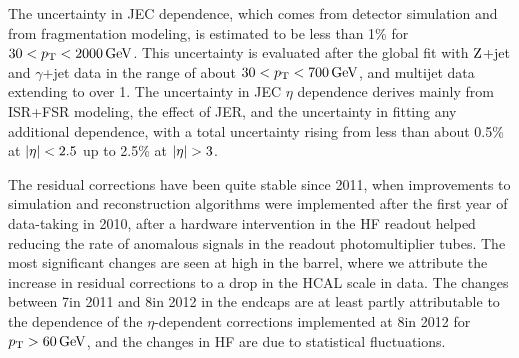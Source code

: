 \documentclass[11pt,twoside,a4paper,cmspaper,final,collab]{cms-tdr}
\begin{document}
The uncertainty in JEC \pt dependence, which comes from detector simulation and from fragmentation modeling, is estimated to be less than 1\% for $30<p_{\mathrm{T}}<2000\,\text{Ge\hspace{-.08em}V}$. This uncertainty is evaluated after the global fit with $\mathrm{Z}$+jet and $\gamma$+jet data in the range of about $30<p_{\mathrm{T}}<700\,\text{Ge\hspace{-.08em}V}$, and multijet data extending to over 1\TeV.
The uncertainty in JEC $\eta$ dependence derives mainly from ISR+FSR modeling, the effect of JER, and the uncertainty in fitting any additional \pt dependence, with a total uncertainty rising from less than about 0.5\% at $\lvert \eta \rvert<2.5$ up to 2.5\% at $\lvert \eta \rvert>3$.

The residual corrections have been quite stable since 2011, when improvements to simulation and reconstruction algorithms were implemented after the first year of data-taking in 2010, after a hardware intervention in the HF readout helped reducing the rate of anomalous signals in the readout photomultiplier tubes. The most significant changes are seen at high \pt in the barrel, where we attribute the increase in residual corrections to a drop in the HCAL scale in data.
The changes between 7\TeV in 2011 and 8\TeV in 2012 in the endcaps are at least partly attributable to the \pt dependence of the $\eta$-dependent corrections implemented at 8\TeV in 2012 for $p_{\mathrm{T}}>60\,\text{Ge\hspace{-.08em}V}$, and the changes in HF are due to statistical fluctuations.
\end{document}
